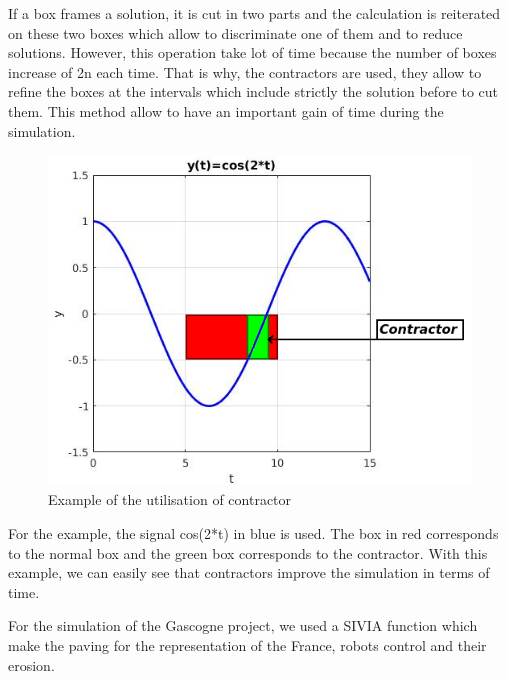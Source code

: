	\newpage

	If a box frames a solution, it is cut in two parts and the calculation is reiterated on these two boxes which allow to discriminate one of them and to reduce solutions. However, this operation take lot of time because the number of boxes increase of  2n each time. That is why, the contractors are used, they allow to refine the boxes at the intervals which include strictly the solution before to cut them. This method allow to have an important gain of time during the simulation. 

	\begin{figure}[!h] 
    \center
    	\includegraphics[scale=0.8]{Contractor.png} 
    	\caption{Example of the utilisation of contractor} 
    \label{Contractor}
	\end{figure} 
	
	For the example, the signal cos(2*t) in blue is used. The box in red corresponds to the normal box and the green box corresponds to the contractor. With this example, we can easily see that contractors improve  the simulation in terms of time. 

	\vspace{0.5 cm}
	
	For the simulation of the Gascogne project, we used a SIVIA function which make the paving for the representation of the France, robots control and their erosion.
	

